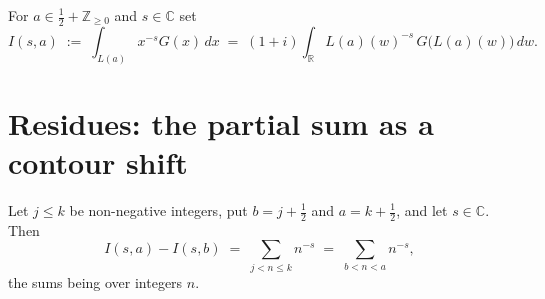 \begin{definition}
\label{def:rs_integral}
\leanok
{}
For $a\in\tfrac12+\mathbb{Z}_{\ge0}$ and $s\in\mathbb{C}$ set
\[
  I(s,a)\;:=\;\int_{L(a)}x^{-s}G(x)\,dx\;=\;(1+i)\int_{\mathbb{R}}L(a)(w)^{-s}\,
     G\bigl(L(a)(w)\bigr)\,dw .
\]
\end{definition}

\section{Residues: the partial sum as a contour shift}
\label{sec:rs_shift}

\begin{theorem}
\label{thm:rs_shift}
\leanok
{}
Let $j\le k$ be non-negative integers, put $b=j+\tfrac12$ and $a=k+\tfrac12$, and let
$s\in\mathbb{C}$.  Then
\[
  I(s,a)-I(s,b)\;=\;\sum_{j<n\le k}n^{-s}\;=\;\sum_{b<n<a}n^{-s},
\]
the sums being over integers $n$.
\end{theorem}

